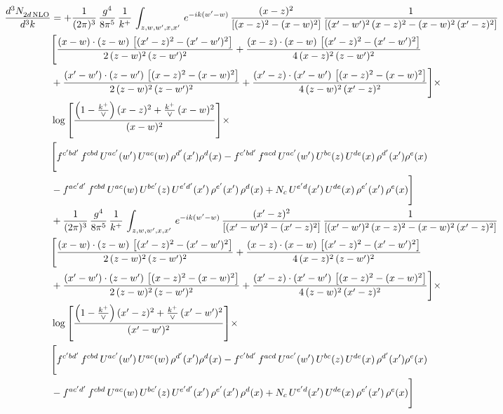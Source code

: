 \documentclass[9pt]{article}
\numberwithin{equation}{section}
\begin{document}
\begin{align}
 \frac{d^{3}N_{2d\,\rm NLO}^{\rm}}{d^{3}k}  & =   +\frac{1}{(2\pi)^{3}}\, \frac{g^{4}}{8\pi^{5}}\,\frac{1}{k^{+}}\,\int_{z,w,w^{\prime},x,x'}\, e^{-ik(w^{\prime}-w)}\,\frac{(x-z)^{2}}{\left[(x-z)^{2}-(x-w)^{2}\right]}\,\frac{1}{\left[(x'-w')^{2}\,(x-z)^{2} - (x-w)^{2}\,(x'-z)^{2}\right]}\notag \\ & \Bigg[\frac{(x-w)\cdot (z-w)\, \left[(x'-z)^{2}-(x'-w')^{2}\right]}{2\, (z-w)^{2}\, (z-w')^{2}}  + \frac{(x-z)\cdot (x-w)\,\left[(x'-z)^{2}-(x'-w')^{2}\right] }{4\,(x-z)^{2}\,(z-w')^{2}}\notag \\ & +\frac{(x'-w')\cdot (z-w')\, \left[(x-z)^{2}-(x-w)^{2}\right]}{2\, (z-w)^{2}\, (z-w')^{2}}+ \frac{(x'-z)\cdot (x'-w')\, \left[(x-z)^{2}-(x-w)^{2}\right]}{4\, (z-w)^{2}\,(x'-z)^{2}}\Bigg]\times\,\notag \\ & \log{\left[\frac{\left(1-\frac{k^{+}}{\vee}\right)(x-z)^{2}+\frac{k^{+}}{\vee}\,(x-w)^{2}}{(x-w)^{2}}\right]} \times\notag \\ & \Bigg[f^{c'bd'}\,f^{cbd}\, U^{ac'}(w')\,U^{ac}(w)\,\rho^{d'}(x')\rho^{d}(x)- f^{c'bd'}\,f^{acd}\,U^{ac'}(w')\,U^{bc}(z)\,U^{de}(x)\,\rho^{d'}(x')\rho^{e}(x) \notag \\ & -f^{ac'd'}\,f^{cbd}\,U^{ac}(w)\,U^{bc'}(z)\,U^{e'd'}(x')\,\rho^{e'}(x')\,\rho^{d}(x) +N_{c}\,U^{e'd}(x')\,U^{de}(x)\,\rho^{e'}(x')\,\rho^{e}(x)\Bigg] \notag \\
& +\frac{1}{(2\pi)^{3}}\, \frac{g^{4}}{8\pi^{5}}\,\frac{1}{k^{+}}\,\int_{z,w,w^{\prime},x,x'}\, e^{-ik(w^{\prime}-w)}\,\frac{(x'-z)^{2}}{\left[(x'-w')^{2}-(x'-z)^{2}\right]}\,\frac{1}{\left[(x'-w')^{2}\,(x-z)^{2} - (x-w)^{2}\,(x'-z)^{2}\right]}\notag \\ & \Bigg[\frac{(x-w)\cdot (z-w)\, \left[(x'-z)^{2}-(x'-w')^{2}\right]}{2\, (z-w)^{2}\, (z-w')^{2}}  + \frac{(x-z)\cdot (x-w)\,\left[(x'-z)^{2}-(x'-w')^{2}\right] }{4\,(x-z)^{2}\,(z-w')^{2}}\notag \\ & +\frac{(x'-w')\cdot (z-w')\, \left[(x-z)^{2}-(x-w)^{2}\right]}{2\, (z-w)^{2}\, (z-w')^{2}}+ \frac{(x'-z)\cdot (x'-w')\, \left[(x-z)^{2}-(x-w)^{2}\right]}{4\, (z-w)^{2}\,(x'-z)^{2}}\Bigg]\times\,\notag \\ & \log{\left[\frac{\left(1-\frac{k^{+}}{\vee}\right)(x'-z)^{2}+\frac{k^{+}}{\vee}\,(x'-w')^{2}}{(x'-w')^{2}}\right]} \times\notag \\ & \Bigg[f^{c'bd'}\,f^{cbd}\, U^{ac'}(w')\,U^{ac}(w)\,\rho^{d'}(x')\rho^{d}(x)- f^{c'bd'}\,f^{acd}\,U^{ac'}(w')\,U^{bc}(z)\,U^{de}(x)\,\rho^{d'}(x')\rho^{e}(x) \notag \\ & -f^{ac'd'}\,f^{cbd}\,U^{ac}(w)\,U^{bc'}(z)\,U^{e'd'}(x')\,\rho^{e'}(x')\,\rho^{d}(x) +N_{c}\,U^{e'd}(x')\,U^{de}(x)\,\rho^{e'}(x')\,\rho^{e}(x)\Bigg]
\end{align}
\end{document}
